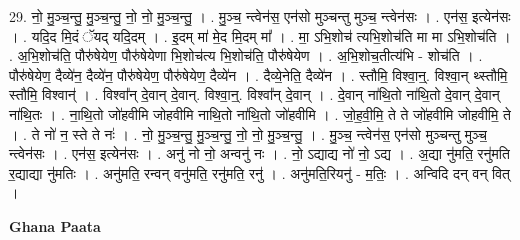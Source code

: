 \documentclass[17pt]{extarticle}
\begin{document}
29. नो॒ मु॒ञ्च॒न्तु॒ मु॒ञ्च॒न्तु॒ नो॒ नो॒ मु॒ञ्च॒न्तु॒ । . मु॒ञ्च॒ न्त्वेन॑स॒ एन॑सो मुञ्चन्तु मुञ्च॒ न्त्वेन॑सः । . एन॑स॒ इत्येन॑सः । . यदि॒द मि॒दं ॅयद् यदि॒दम् । . इ॒दम् मा॑ मे॒द मि॒दम् मा᳚ । . मा॒ ऽभि॒शोच॑ त्यभि॒शोच॑ति मा मा ऽभि॒शोच॑ति । . अ॒भि॒शोच॑ति॒ पौरु॑षेयेण॒ पौरु॑षेयेणा भि॒शोच॑त्य भि॒शोच॑ति॒ पौरु॑षेयेण । . अ॒भि॒शोच॒तीत्य॑भि - शोच॑ति । . पौरु॑षेयेण॒ दैव्ये॑न॒ दैव्ये॑न॒ पौरु॑षेयेण॒ पौरु॑षेयेण॒ दैव्ये॑न । . दैव्ये॒नेति॒ दैव्ये॑न । . स्तौमि॒ विश्वा॒न्॒. विश्वा॒न् थ्स्तौमि॒ स्तौमि॒ विश्वान्॑ । . विश्वा᳚न् दे॒वान् दे॒वान्. विश्वा॒न्॒. विश्वा᳚न् दे॒वान् । . दे॒वान् ना॑थि॒तो ना॑थि॒तो दे॒वान् दे॒वान् ना॑थि॒तः । . ना॒थि॒तो जो॑हवीमि जोहवीमि नाथि॒तो ना॑थि॒तो जो॑हवीमि । . जो॒ह॒वी॒मि॒ ते ते जो॑हवीमि जोहवीमि॒ ते । . ते नो॑ न॒ स्ते ते नः॑ । . नो॒ मु॒ञ्च॒न्तु॒ मु॒ञ्च॒न्तु॒ नो॒ नो॒ मु॒ञ्च॒न्तु॒ । . मु॒ञ्च॒ न्त्वेन॑स॒ एन॑सो मुञ्चन्तु मुञ्च॒ न्त्वेन॑सः । . एन॑स॒ इत्येन॑सः । . अनु॑ नो नो॒ अन्वनु॑ नः । . नो॒ ऽद्याद्य नो॑ नो॒ ऽद्य । . अ॒द्या नु॑मति॒ रनु॑मति र॒द्याद्या नु॑मतिः । . अनु॑मति॒ रन्वन् वनु॑मति॒ रनु॑मति॒ रनु॑ । . अनु॑मति॒रियनु॑ - म॒तिः॒ । . अन्विदि दन् वन् वित् । \newline

\textbf{Ghana Paata } \newline
\end{document}
